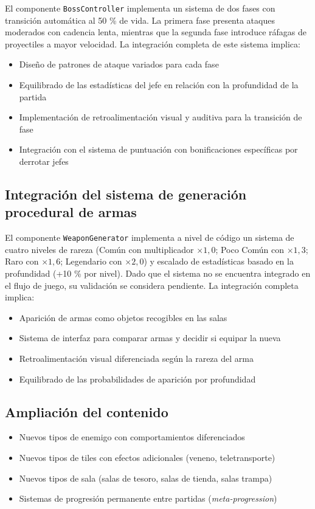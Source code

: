 El componente \texttt{BossController} implementa un sistema de dos fases con transición automática al 50 \% de vida. La primera fase presenta ataques moderados con cadencia lenta, mientras que la segunda fase introduce ráfagas de proyectiles a mayor velocidad. La integración completa de este sistema implica:
\begin{itemize}
\item Diseño de patrones de ataque variados para cada fase
\item Equilibrado de las estadísticas del jefe en relación con la profundidad de la partida
\item Implementación de retroalimentación visual y auditiva para la transición de fase
\item Integración con el sistema de puntuación con bonificaciones específicas por derrotar jefes
\end{itemize}

\subsection{Integración del sistema de generación procedural de armas}


El componente \texttt{WeaponGenerator} implementa a nivel de código un sistema de cuatro niveles de rareza (Común con multiplicador $\times 1{,}0$; Poco Común con $\times 1{,}3$; Raro con $\times 1{,}6$; Legendario con $\times 2{,}0$) y escalado de estadísticas basado en la profundidad (+10 \% por nivel). Dado que el sistema no se encuentra integrado en el flujo de juego, su validación se considera pendiente. La integración completa implica:
\begin{itemize}
\item Aparición de armas como objetos recogibles en las salas
\item Sistema de interfaz para comparar armas y decidir si equipar la nueva
\item Retroalimentación visual diferenciada según la rareza del arma
\item Equilibrado de las probabilidades de aparición por profundidad
\end{itemize}

\subsection{Ampliación del contenido}


\begin{itemize}
\item Nuevos tipos de enemigo con comportamientos diferenciados
\item Nuevos tipos de tiles con efectos adicionales (veneno, teletransporte)
\item Nuevos tipos de sala (salas de tesoro, salas de tienda, salas trampa)
\item Sistemas de progresión permanente entre partidas (\textit{meta-progression})
\end{itemize}


